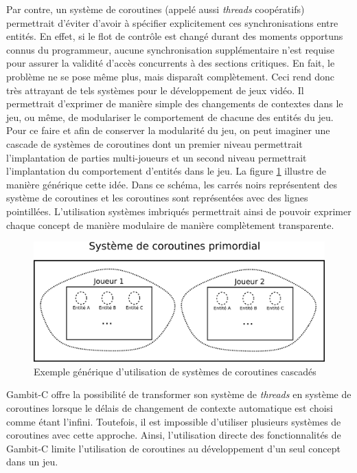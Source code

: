 \documentclass[12pt,twoside,letterpaper,francais]{book}
\begin{document}
Par contre, un système de coroutines (appelé aussi \textit{threads}
coopératifs) permettrait d'éviter d'avoir à spécifier explicitement
ces synchronisations entre entités. En effet, si le flot de contrôle
est changé durant des moments opportuns connus du programmeur, aucune
synchronisation supplémentaire n'est requise pour assurer la validité
d'accès concurrents à des sections critiques. En fait, le problème ne
se pose même plus, mais disparaît complètement. Ceci rend donc très
attrayant de tels systèmes pour le développement de jeux vidéo. Il
permettrait d'exprimer de manière simple des changements de contextes
dans le jeu, ou même, de modulariser le comportement de chacune des
entités du jeu. Pour ce faire et afin de conserver la modularité du
jeu, on peut imaginer une cascade de systèmes de coroutines dont un
premier niveau permettrait l'implantation de parties multi-joueurs et
un second niveau permettrait l'implantation du comportement d'entités
dans le jeu. La figure \ref{Corout:usecase} illustre de manière
générique cette idée. Dans ce schéma, les carrés noirs représentent
des système de coroutines et les coroutines sont représentées avec des
lignes pointillées. L'utilisation systèmes imbriqués permettrait ainsi
de pouvoir exprimer chaque concept de manière modulaire de manière
complètement transparente.

\begin{figure}[htb!]
  \center
  \includegraphics[scale=1.2]{corout-usecase-design}
  \caption{Exemple générique d'utilisation de systèmes de coroutines
    cascadés}
  \label{Corout:usecase}
\end{figure}

Gambit-C offre la possibilité de transformer son système de
\textit{threads} en système de coroutines lorsque le délais de
changement de contexte automatique est choisi comme étant
l'infini. Toutefois, il est impossible d'utiliser plusieurs systèmes
de coroutines avec cette approche. Ainsi, l'utilisation directe des
fonctionnalités de Gambit-C limite l'utilisation de coroutines au
développement d'un seul concept dans un jeu.
\end{document}
